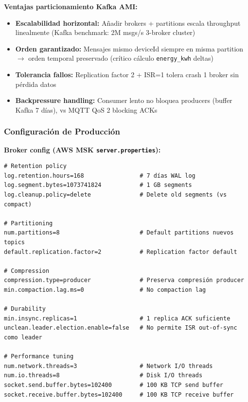 \textbf{Ventajas particionamiento Kafka AMI:}

\begin{itemize}
    \item \textbf{Escalabilidad horizontal:} Añadir brokers + partitions escala throughput linealmente (Kafka benchmark: 2M msgs/s 3-broker cluster)~\cite{kraborKafkaPerformanceScalability2023}
    \item \textbf{Orden garantizado:} Mensajes mismo deviceId siempre en misma partition $\rightarrow$ orden temporal preservado (crítico cálculo \texttt{energy\_kwh} deltas)
    \item \textbf{Tolerancia fallos:} Replication factor 2 + ISR=1 tolera crash 1 broker sin pérdida datos
    \item \textbf{Backpressure handling:} Consumer lento no bloquea producers (buffer Kafka 7 días), vs MQTT QoS 2 blocking ACKs~\cite{apacheKafkaDocumentation2024}
\end{itemize}

\subsubsection{Configuración de Producción}
\label{sec:server-kafka-config}

\textbf{Broker config (AWS MSK \texttt{server.properties}):}

\begin{verbatim}
# Retention policy
log.retention.hours=168                # 7 días WAL log
log.segment.bytes=1073741824           # 1 GB segments
log.cleanup.policy=delete              # Delete old segments (vs compact)

# Partitioning
num.partitions=8                       # Default partitions nuevos topics
default.replication.factor=2           # Replication factor default

# Compression
compression.type=producer              # Preserva compresión producer
min.compaction.lag.ms=0                # No compaction lag

# Durability
min.insync.replicas=1                  # 1 replica ACK suficiente
unclean.leader.election.enable=false   # No permite ISR out-of-sync como leader

# Performance tuning
num.network.threads=3                  # Network I/O threads
num.io.threads=8                       # Disk I/O threads
socket.send.buffer.bytes=102400        # 100 KB TCP send buffer
socket.receive.buffer.bytes=102400     # 100 KB TCP receive buffer
\end{verbatim}

